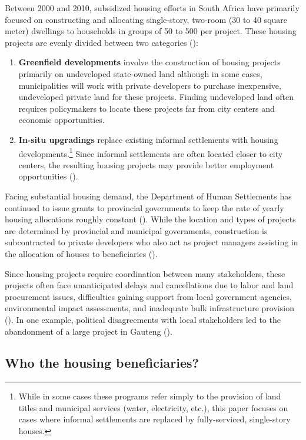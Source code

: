 \documentclass[12pt]{article}
\begin{document}
Between 2000 and 2010, subsidized housing efforts in South Africa have primarily focused on constructing and allocating single-story, two-room (30 to 40 square meter) dwellings to households in groups of 50 to 500 per project.  These housing projects are evenly divided between two categories (\cite{dhsreports}):
\begin{enumerate}
	\item  \textbf{Greenfield developments} involve the construction of housing projects primarily on undeveloped state-owned land although in some cases, municipalities will work with private developers to purchase inexpensive, undeveloped private land for these projects.  Finding undeveloped land often requires policymakers to locate these projects far from city centers and economic opportunities.  
	\item  \textbf{In-situ upgradings} replace existing informal settlements with housing developments.\footnote{While in some cases these programs refer simply to the provision of land titles and municipal services (water, electricity, etc.), this paper focuses on cases where informal settlements are replaced by fully-serviced, single-story houses.}  Since informal settlements are often located closer to city centers, the resulting housing projects may provide better employment opportunities (\cite{serihistory}).
\end{enumerate}
Facing substantial housing demand, the Department of Human Settlements has continued to issue grants to provincial governments to keep the rate of yearly housing allocations roughly constant (\cite{dhsreports}).  While the location and types of projects are determined by provincial and municipal governments, construction is subcontracted to private developers who also act as project managers assisting in the allocation of houses to beneficiaries (\cite{seriq}).

Since housing projects require coordination between many stakeholders, these projects often face unanticipated delays and cancellations due to labor and land procurement issues, difficulties gaining support from local government agencies, environmental impact assessments, and inadequate bulk infrastructure provision (\cite{dhsreports}).  In one example, political disagreements with local stakeholders led to the abandonment of a large project in Gauteng (\cite{protest}).

\subsection{Who the housing beneficiaries?}
\end{document}
